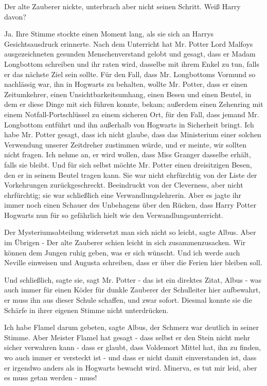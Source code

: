 Der alte Zauberer nickte, unterbrach aber nicht seinen Schritt. \glqq{}Weiß Harry
davon?\grqq{}

\glqq{}Ja.\grqq{} Ihre Stimme stockte einen Moment lang, als sie sich an Harrys
Gesichtsausdruck erinnerte. \glqq{}Nach dem Unterricht hat Mr. Potter Lord
Malfoys ausgezeichneten gesunden Menschenverstand gelobt und gesagt, dass er
Madam Longbottom schreiben und ihr raten wird, dasselbe mit ihrem Enkel zu tun,
falls er das nächste Ziel sein sollte. Für den Fall, dass Mr. Longbottoms
Vormund so nachlässig war, ihn in Hogwarts zu behalten, wollte Mr. Potter, dass
er einen Zeitumkehrer, einen Unsichtbarkeitsumhang, einen Besen und einen
Beutel, in dem er diese Dinge mit sich führen konnte, bekam; außerdem einen
Zehenring mit einem Notfall-Portschlüssel zu einem sicheren Ort, für den Fall,
dass jemand Mr. Longbottom entführt und ihn außerhalb von Hogwarts in Sicherheit
bringt. Ich habe Mr. Potter gesagt, dass ich nicht glaube, dass das Ministerium
einer solchen Verwendung unserer Zeitdreher zustimmen würde, und er meinte, wir
sollten nicht fragen. Ich nehme an, er wird wollen, dass Miss Granger dasselbe
erhält, falls sie bleibt. Und für sich selbst möchte Mr. Potter einen
dreisitzigen Besen, den er in seinem Beutel tragen kann.\grqq{} Sie war nicht
ehrfürchtig von der Liste der Vorkehrungen zurückgeschreckt. Beeindruckt von der
Cleverness, aber nicht ehrfürchtig; sie war schließlich eine
Verwandlungslehrerin. Aber es jagte ihr immer noch einen Schauer des Unbehagens
über den Rücken, dass Harry Potter Hogwarts nun für so gefährlich hielt wie den
Verwandlungsunterricht.

\glqq{}Der Mysteriumsabteilung widersetzt man sich nicht so leicht\grqq{}, sagte
Albus. \glqq{}Aber im Übrigen -\grqq{} Der alte Zauberer schien leicht in sich
zusammenzusacken. \glqq{}Wir können dem Jungen ruhig geben, was er sich wünscht.
Und ich werde auch Neville einweisen und Augusta schreiben, dass er über die
Ferien hier bleiben soll.\grqq{}

\glqq{}Und schließlich\grqq{}, sagte sie, \glqq{}sagt Mr. Potter - das ist ein
direktes Zitat, Albus - was auch immer für einen Köder für dunkle Zauberer der
Schulleiter hier aufbewahrt, er muss ihn aus dieser Schule schaffen, und zwar
sofort.\grqq{} Diesmal konnte sie die Schärfe in ihrer eigenen Stimme nicht
unterdrücken.

\glqq{}Ich habe Flamel darum gebeten\grqq{}, sagte Albus, der Schmerz war
deutlich in seiner Stimme. \glqq{}Aber Meister Flamel hat gesagt - dass selbst er
den Stein nicht mehr sicher verwahren kann - dass er glaubt, dass Voldemort
Mittel hat, ihn zu finden, wo auch immer er versteckt ist - und dass er nicht
damit einverstanden ist, dass er irgendwo anders als in Hogwarts bewacht wird.
Minerva, es tut mir leid, aber es muss getan werden - muss!\grqq{}

